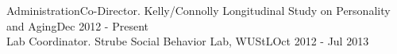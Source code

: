 \documentclass {resume}
\begin{document}
\begin{samepage}\begin{rSection}{\textrm{Administration}}Co-Director. Kelly/Connolly Longitudinal Study on Personality and Aging\hfill Dec 2012 - Present\smallskip\\
Lab Coordinator. Strube Social Behavior Lab,  WUStL\hfill Oct 2012 - Jul 2013
\end{rSection}\end{samepage}%
\end{document}
